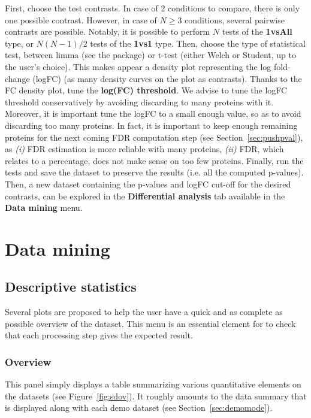 \documentclass[12pt]{article}
\begin{document}
First, choose the test contrasts. In case of 2 conditions to compare, there is only one possible contrast. 
However, in case of $N  \geq 3$ conditions, several pairwise contrasts are possible. 
Notably, it is possible to perform $N$ tests of the \textbf{1vsAll} type, or $N(N-1)/2$ tests of the \textbf{1vs1} type.
Then, choose the type of statistical test, between limma (see the  package) or t-test (either Welch or Student, up to the user's choice). This makes appear a density plot representing the log fold-change (logFC) (as many density curves on the plot as contrasts). Thanks to the FC density plot, tune the \textbf{log(FC) threshold}.
We advise to tune the logFC threshold conservatively by avoiding discarding to many proteins with it. Moreover, it is important tune the logFC to a small enough value, so as to avoid discarding too many proteins. In fact, it is important to keep enough remaining proteins for the next coming FDR computation step (see Section~\ref{sec:pushpval}), as \emph{(i)} FDR estimation is more reliable with many proteins, \emph{(ii)} FDR, which relates to a percentage, does not make sense on too few proteins.
Finally, run the tests and save the dataset to preserve the results (i.e. all the computed p-values). Then, a new dataset containing the p-values and logFC cut-off for the desired contrasts, can be explored in the \textbf{Differential analysis} tab available in the \textbf{Data mining} menu.



\section{Data mining}
\subsection{Descriptive statistics}\label{sec:descriptivestatistics}

Several plots are proposed to help the user have a 
quick and as complete as possible overview of the dataset. This menu is 
an essential element for to check that each processing step 
gives the expected result.

\subsubsection{Overview}
This panel simply displays a table summarizing various quantitative elements on the datasets (see Figure~\ref{fig:sdov}).
It roughly amounts to the data summary that is displayed along with each demo dataset (see Section~\ref{sec:demomode}).
\end{document}
